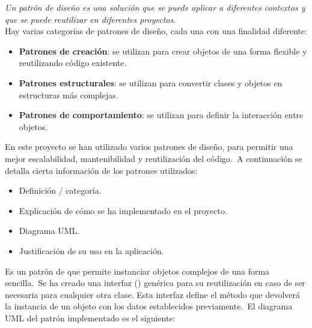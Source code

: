 
\textit{Un patrón de diseño es una solución que se puede aplicar a diferentes contextos y que se
puede reutilizar en diferentes proyectos.} \\
Hay varias categorías de patrones de diseño, cada una con una finalidad diferente\cite{designPatternClassification}:
\begin{itemize}
	\item \textbf{Patrones de creación}: se utilizan para crear objetos de una forma flexible y reutilizando código
	existente.
	\item \textbf{Patrones estructurales}: se utilizan para convertir clases y objetos en estructuras más complejas.
	\item \textbf{Patrones de comportamiento}: se utilizan para definir la interacción entre objetos.
\end{itemize}
\label{itm:categorías-patrones}

En este proyecto se han utilizado varios patrones de diseño, para permitir una mejor escalabilidad, mantenibilidad y
reutilización del código.\ A continuación se detalla cierta información de los patrones utilizados:
\begin{itemize}
	\item Definición / categoría.
	\item Explicación de cómo se ha implementado en el proyecto.
	\item Diagrama UML\@.
	\item Justificación de su uso en la aplicación.
\end{itemize}
\label{itm:uso-patrones}

Es un patrón de  que permite instanciar objetos complejos de una forma sencilla.\ Se ha creado una
interfaz () genérica para su reutilización en caso de ser necesaria para cualquier otra clase.
Esta interfaz define el método  que devolverá la instancia de un objeto con los datos establecidos
previamente.\ El diagrama UML del patrón implementado es el siguiente:

